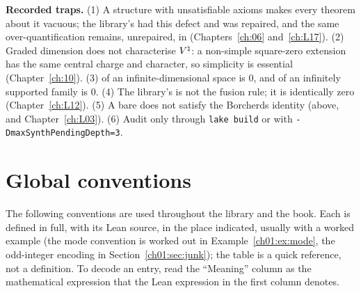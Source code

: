 \begin{warning}
\textbf{Recorded traps.} (1) A structure with unsatisfiable axioms makes every theorem about it
vacuous; the library's  had this defect and was repaired, and the same
over-quantification remains, unrepaired, in 
(Chapters~\ref{ch:06} and~\ref{ch:L17}). (2) Graded dimension does not characterise ${V^{\natural}}$: a
non-simple square-zero extension has the same central charge and character, so simplicity is
essential (Chapter~\ref{ch:10}). (3)  of an infinite-dimensional space is $0$,
and  of an infinitely supported family is $0$. (4) The library's  is not
the fusion rule; it is identically zero (Chapter~\ref{ch:L12}). (5) A bare  does
not satisfy the Borcherds identity (above, and Chapter~\ref{ch:L03}). (6) Audit only through
\texttt{lake build} or with \texttt{-DmaxSynthPendingDepth=3}.
\end{warning}

\section{Global conventions}\label{ch01:sec:conventions}

The following conventions are used throughout the library and the book. Each is defined in full,
with its Lean source, in the place indicated, usually with a worked example (the mode convention is
worked out in Example~\ref{ch01:ex:mode}, the odd-integer encoding in Section~\ref{ch01:sec:junk});
the table is a quick reference, not a definition. To decode an entry, read the ``Meaning'' column
as the mathematical expression that the Lean expression in the first column denotes.

